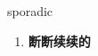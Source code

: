 
\begin{frame}
{\huge sporadic}
\begin{center}
\begin{enumerate}\Large
  \item \textbf{断断续续的}
\end{enumerate}
\end{center}
\end{frame}
